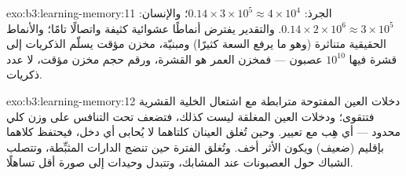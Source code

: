 \begin{solution}{exo:b3:learning-memory:11}
الجرذ: $0.14\times 3\times 10^{5} \approx 4\times 10^{4}$؛ والإنسان: $0.14
\times 2\times 10^{6} \approx 3\times 10^{5}$. والتقدير يفترض
أنماطًا عشوائية كثيفة واتصالًا تامًا؛ والأنماط الحقيقية
متناثرة (وهو ما يرفع السعة كثيرًا) ومبنيّة،  مخزن
مؤقت يسلّم الذكريات إلى قشرة فيها $10^{10}$ عصبون
--- فمخزن العمر هو القشرة، ورقم  حجم مخزن مؤقت، لا
عدد ذكريات.
\end{solution}

\begin{solution}{exo:b3:learning-memory:12}
دخلات العين المفتوحة مترابطة مع اشتعال الخلية القشرية
فتتقوى؛ ودخلات العين المغلقة ليست كذلك، فتضعف تحت التنافس
على وزن كلي محدود --- أي هِب مع تعيير. وحين تُغلق العينان
كلتاهما لا يُحابى أي دخل، فيحتفظ كلاهما بإقليم (ضعيف) ويكون
الأثر أخف. وتُغلق الفترة حين تنضج الدارات المثبِّطة، وتتصلب
الشباك حول العصبونات عند المشابك، وتتبدل وحيدات 
إلى صورة أقل تساهلًا.
\end{solution}

